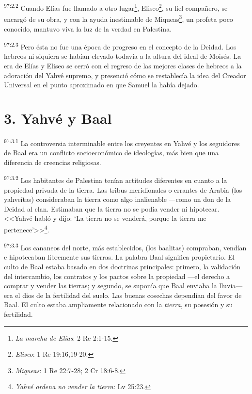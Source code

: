 \par
\textsuperscript{97:2.2} Cuando Elías fue llamado a otro lugar\footnote{\textit{La marcha de Elías}: 2 Re 2:1-15.}, Eliseo\footnote{\textit{Eliseo}: 1 Re 19:16,19-20.}, su fiel compañero, se encargó de su obra, y con la ayuda inestimable de Miqueas\footnote{\textit{Miqueas}: 1 Re 22:7-28; 2 Cr 18:6-8.}, un profeta poco conocido, mantuvo viva la luz de la verdad en Palestina.

\par
\textsuperscript{97:2.3} Pero ésta no fue una época de progreso en el concepto de la Deidad. Los hebreos ni siquiera se habían elevado todavía a la altura del ideal de Moisés. La era de Elías y Eliseo se cerró con el regreso de las mejores clases de hebreos a la adoración del Yahvé supremo, y presenció cómo se restablecía la idea del Creador Universal en el punto aproximado en que Samuel la había dejado.

\section*{3. Yahvé y Baal}
\par
\textsuperscript{97:3.1} La controversia interminable entre los creyentes en Yahvé y los seguidores de Baal era un conflicto socioeconómico de ideologías, más bien que una diferencia de creencias religiosas.

\par
\textsuperscript{97:3.2} Los habitantes de Palestina tenían actitudes diferentes en cuanto a la propiedad privada de la tierra. Las tribus meridionales o errantes de Arabia (los yahveítas) consideraban la tierra como algo inalienable ---como un don de la Deidad al clan. Estimaban que la tierra no se podía vender ni hipotecar. <<Yahvé habló y dijo: `La tierra no se venderá, porque la tierra me pertenece'>>\footnote{\textit{Yahvé ordena no vender la tierra}: Lv 25:23.}.

\par
\textsuperscript{97:3.3} Los cananeos del norte, más establecidos, (los baalitas) compraban, vendían e hipotecaban libremente sus tierras. La palabra Baal significa propietario. El culto de Baal estaba basado en dos doctrinas principales: primero, la validación del intercambio, los contratos y los pactos sobre la propiedad ---el derecho a comprar y vender las tierras; y segundo, se suponía que Baal enviaba la lluvia--- era el dios de la fertilidad del suelo. Las buenas cosechas dependían del favor de Baal. El culto estaba ampliamente relacionado con la \textit{tierra}, su posesión y su fertilidad.

